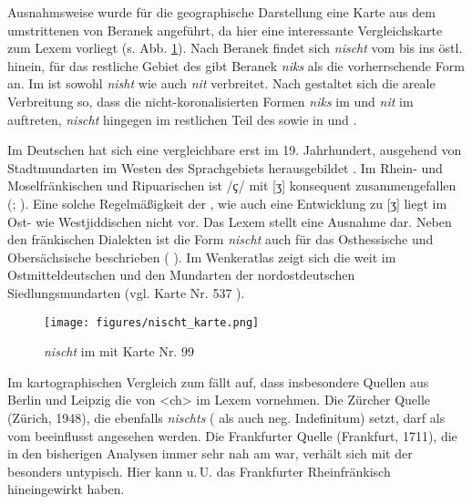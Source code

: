 Ausnahmsweise wurde für die geographische Darstellung eine Karte aus dem umstrittenen  von Beranek angeführt, da hier eine interessante Vergleichskarte zum Lexem  vorliegt (s. Abb. \ref{kartenischt}). Nach Beranek findet sich \textit{nischt} vom  bis ins östl.  hinein, für das restliche Gebiet des  gibt Beranek \textit{niks} als die vorherrschende Form an. Im  ist sowohl  \textit{nisht} wie auch  \textit{nit} verbreitet. Nach \textcite[375]{Bin-Nun1973} gestaltet sich die areale Verbreitung so, dass die nicht-koronalisierten Formen \textit{niks} im  und \textit{nit} im  auftreten, \textit{nischt} hingegen im restlichen Teil des  sowie in  und . 

Im Deutschen hat sich eine vergleichbare  erst im 19. Jahrhundert, ausgehend von Stadtmundarten im Westen des Sprachgebiets herausgebildet \parencite[97–101]{Herrgen1986}. Im Rhein- und Moselfränkischen und Ripuarischen ist /ҫ/ mit  [ʒ] konsequent zusammengefallen (\cite[275]{Schirmunski1962}; \cite{Herrgen1986}). Eine solche Regelmäßigkeit der , wie auch eine Entwicklung zu  [ʒ] liegt im Ost- wie Westjiddischen nicht vor. Das Lexem  stellt eine Ausnahme dar. Neben den fränkischen Dialekten ist die Form \textit{nischt} auch für das Osthessische und Obersächsische beschrieben ( \citeyear[Bd. 13, Sp. 729]{DeutschesWB}). Im Wenkeratlas zeigt sich die  weit im Ostmitteldeutschen und den Mundarten der nordostdeutschen Siedlungsmundarten (vgl.  Karte Nr. 537 ).\\

 \begin{figure}[h!]
		\centering
\texttt{[image: figures/nischt\_karte.png]}
		\caption{\label{kartenischt} \textit{nischt} im  mit  Karte Nr. 99}
		\end{figure}
\FloatBarrier
		
 Im kartographischen Vergleich zum  fällt auf, dass insbesondere Quellen aus Berlin und Leipzig die  von <ch> im Lexem  vornehmen. Die Zürcher  Quelle  (Zürich, 1948), die ebenfalls \textit{nischts} ( als auch neg. Indefinitum) setzt, darf als vom  beeinflusst angesehen werden. Die Frankfurter Quelle  (Frankfurt, 1711), die in den bisherigen Analysen immer sehr nah am  war, verhält sich mit der  besonders untypisch. Hier kann u.\,U. das Frankfurter Rheinfränkisch hineingewirkt haben.

